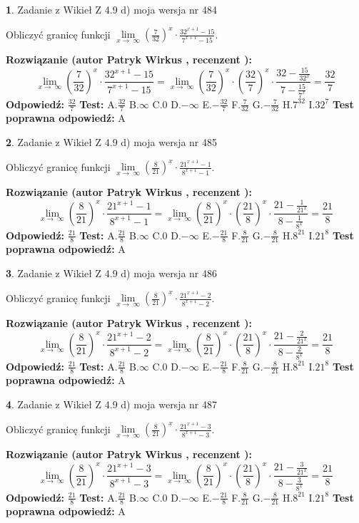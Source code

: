 \documentclass[12pt, a4paper]{article}
\theoremstyle{definition} %
\newtheorem{zad}{}
\newcommand{\zadStart}[1]{\begin{zad}#1\newline}
\newcommand{\zadStop}{\end{zad}}
\newcommand{\rozwStart}[2]{\noindent \textbf{Rozwiązanie (autor #1 , recenzent #2): }\newline}
\newcommand{\rozwStop}{\newline}
\newcommand{\odpStart}{\noindent \textbf{Odpowiedź:}\newline}
\newcommand{\odpStop}{\newline}
\newcommand{\testStart}{\noindent \textbf{Test:}\newline}
\newcommand{\testStop}{\newline}
\newcommand{\kluczStart}{\noindent \textbf{Test poprawna odpowiedź:}\newline}
\newcommand{\kluczStop}{\newline}
\begin{document}
\zadStart{Zadanie z Wikieł Z 4.9 d) moja wersja nr 484}


Obliczyć granicę funkcji  $\lim\limits_{x\to\ \infty}(\frac{7}{32})^{x}\cdot\frac{32^{x+1}-15}{7^{x+1}-15}$.
\zadStop
\rozwStart{Patryk Wirkus}{}
$$\lim\limits_{x\to\ \infty}(\frac{7}{32})^{x}\cdot\frac{32^{x+1}-15}{7^{x+1}-15}=\lim\limits_{x\to\ \infty}(\frac{7}{32})^{x}\cdot(\frac{32}{7})^{x} \cdot \frac{32-\frac{15}{32^{x}}}{7-\frac{15}{7^{x}}} = \frac{32}{7}$$
\rozwStop
\odpStart
$\frac{32}{7}$
\odpStop
\testStart
A.$\frac{32}{7}$ B.$\infty$ C.$0$ D.$-\infty$ E.$-\frac{32}{7}$
F.$\frac{7}{32}$ G.$-\frac{7}{32}$
H.$7^{32}$
I.$32^{7}$
\testStop
\kluczStart
A
\kluczStop



\zadStart{Zadanie z Wikieł Z 4.9 d) moja wersja nr 485}


Obliczyć granicę funkcji  $\lim\limits_{x\to\ \infty}(\frac{8}{21})^{x}\cdot\frac{21^{x+1}-1}{8^{x+1}-1}$.
\zadStop
\rozwStart{Patryk Wirkus}{}
$$\lim\limits_{x\to\ \infty}(\frac{8}{21})^{x}\cdot\frac{21^{x+1}-1}{8^{x+1}-1}=\lim\limits_{x\to\ \infty}(\frac{8}{21})^{x}\cdot(\frac{21}{8})^{x} \cdot \frac{21-\frac{1}{21^{x}}}{8-\frac{1}{8^{x}}} = \frac{21}{8}$$
\rozwStop
\odpStart
$\frac{21}{8}$
\odpStop
\testStart
A.$\frac{21}{8}$ B.$\infty$ C.$0$ D.$-\infty$ E.$-\frac{21}{8}$
F.$\frac{8}{21}$ G.$-\frac{8}{21}$
H.$8^{21}$
I.$21^{8}$
\testStop
\kluczStart
A
\kluczStop



\zadStart{Zadanie z Wikieł Z 4.9 d) moja wersja nr 486}


Obliczyć granicę funkcji  $\lim\limits_{x\to\ \infty}(\frac{8}{21})^{x}\cdot\frac{21^{x+1}-2}{8^{x+1}-2}$.
\zadStop
\rozwStart{Patryk Wirkus}{}
$$\lim\limits_{x\to\ \infty}(\frac{8}{21})^{x}\cdot\frac{21^{x+1}-2}{8^{x+1}-2}=\lim\limits_{x\to\ \infty}(\frac{8}{21})^{x}\cdot(\frac{21}{8})^{x} \cdot \frac{21-\frac{2}{21^{x}}}{8-\frac{2}{8^{x}}} = \frac{21}{8}$$
\rozwStop
\odpStart
$\frac{21}{8}$
\odpStop
\testStart
A.$\frac{21}{8}$ B.$\infty$ C.$0$ D.$-\infty$ E.$-\frac{21}{8}$
F.$\frac{8}{21}$ G.$-\frac{8}{21}$
H.$8^{21}$
I.$21^{8}$
\testStop
\kluczStart
A
\kluczStop



\zadStart{Zadanie z Wikieł Z 4.9 d) moja wersja nr 487}


Obliczyć granicę funkcji  $\lim\limits_{x\to\ \infty}(\frac{8}{21})^{x}\cdot\frac{21^{x+1}-3}{8^{x+1}-3}$.
\zadStop
\rozwStart{Patryk Wirkus}{}
$$\lim\limits_{x\to\ \infty}(\frac{8}{21})^{x}\cdot\frac{21^{x+1}-3}{8^{x+1}-3}=\lim\limits_{x\to\ \infty}(\frac{8}{21})^{x}\cdot(\frac{21}{8})^{x} \cdot \frac{21-\frac{3}{21^{x}}}{8-\frac{3}{8^{x}}} = \frac{21}{8}$$
\rozwStop
\odpStart
$\frac{21}{8}$
\odpStop
\testStart
A.$\frac{21}{8}$ B.$\infty$ C.$0$ D.$-\infty$ E.$-\frac{21}{8}$
F.$\frac{8}{21}$ G.$-\frac{8}{21}$
H.$8^{21}$
I.$21^{8}$
\testStop
\kluczStart
A
\kluczStop
\end{document}

